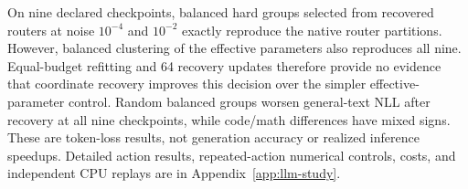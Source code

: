On nine declared checkpoints, balanced hard groups selected from recovered
routers at noise $10^{-4}$ and $10^{-2}$ exactly reproduce the native
router partitions. However, balanced clustering of the effective parameters
also reproduces all nine. Equal-budget refitting and 64 recovery updates
 therefore provide no evidence that coordinate recovery improves this
 decision over the simpler effective-parameter control. Random balanced
 groups worsen general-text NLL after recovery at all nine checkpoints,
while code/math differences have mixed signs. These are token-loss results,
not generation accuracy or realized inference speedups. Detailed action
results, repeated-action numerical controls, costs, and independent CPU
replays are in Appendix~\ref{app:llm-study}.
